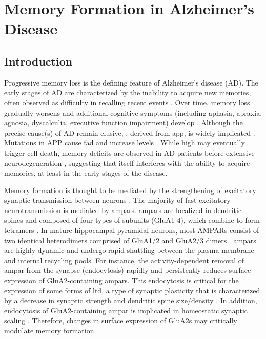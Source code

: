 \chapter{Memory Formation in Alzheimer's Disease \label{chap-ad}}
\section{Introduction}

Progressive memory loss is the defining feature of Alzheimer’s disease (AD).  The early stages of AD are characterized by the inability to acquire new memories, often observed as difficulty in recalling recent events \citep{wilson83,storandt89,albert96}. Over time, memory loss gradually worsens and additional cognitive symptoms (including aphasia, apraxia, agnosia, dyscalculia, executive function impairment) develop \citep{shah06}. Although the precise cause(s) of AD remain elusive, \abeta{}, derived from \gls{app}, is widely implicated \citep{tanzi01,selkoe02}. Mutations in APP cause \gls{fad} \citep{price98,hardy02} and increase \abeta{} levels \citep{citron92,cai93}.  While high \abeta{} may eventually trigger cell death, memory deficits are observed in AD patients before extensive neurodegeneration \citep{selkoe02}, suggesting that \abeta{} itself interferes with the ability to acquire memories, at least in the early stages of the disease.  

Memory formation is thought to be mediated by the strengthening of excitatory synaptic transmission between neurons \citep{bailey93, lamprecht04}.  The majority of fast excitatory neurotransmission is mediated by \glspl{ampar}.  \Glspl{ampar} are localized in dendritic spines and composed of four types of subunits (GluA1-4), which combine to form tetramers \citep{hollmann94}.  In mature hippocampal pyramidal neurons, most AMPARs consist of two identical heterodimers comprised of GluA1/2 and GluA2/3 dimers \citep{wenthold96}.  \Glspl{ampar} are highly dynamic and undergo rapid shuttling between the plasma membrane and internal recycling pools. For instance, the activity-dependent removal of \gls{ampar} from the synapse (endocytosis) rapidly and persistently reduces surface expression of GluA2-containing \glspl{ampar}. This endocytosis is critical for the expression of some forms of \gls{ltd}, a type of synaptic plasticity that is characterized by a decrease in synaptic strength and dendritic spine size/density \citep{malinow02,collingridge04,zhou04}. In addition, endocytosis of GluA2-containing \gls{ampar} is implicated in homeostatic synaptic scaling \citep{gainey09}. Therefore, changes in surface expression of GluA2s may critically modulate memory formation.  

